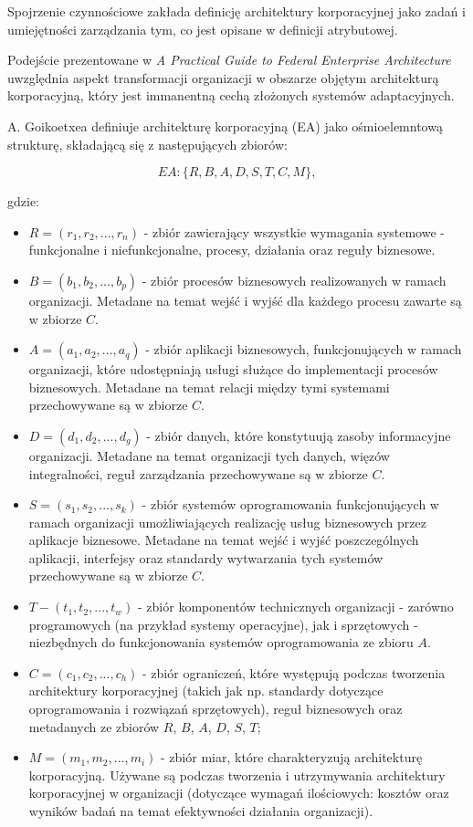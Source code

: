 Spojrzenie czynnościowe zakłada definicję architektury korporacyjnej jako zadań i umiejętności zarządzania tym, co jest opisane w definicji atrybutowej. \cite{ArchKorpSzymSup}

Podejście prezentowane w \emph{A Practical Guide to Federal Enterprise Architecture} uwzględnia aspekt transformacji organizacji w obszarze objętym architekturą korporacyjną, który jest immanentną cechą złożonych systemów adaptacyjnych. \cite{ArchKorpSob} 

A. Goikoetxea definiuje architekturę korporacyjną (EA) jako ośmioelemntową strukturę, składającą się z następujących zbiorów:

\begin{center}
\begin{equation}EA: \{R, B, A, D, S, T, C, M\},\end{equation}
\end{center}

gdzie:
\begin{itemize}
\item{$R = (r_{1}, r_{2},..., r_{n})$ - zbiór zawierający wszystkie wymagania systemowe - funkcjonalne i niefunkcjonalne, procesy, działania oraz reguły biznesowe.}
\item{$B = (b_{1}, b_{2},..., b_{p})$ - zbiór procesów biznesowych realizowanych w ramach organizacji. Metadane na temat wejść i wyjść dla każdego procesu zawarte są w zbiorze $C$.}
\item{$A = (a_{1}, a_{2},..., a_{q})$ - zbiór aplikacji biznesowych, funkcjonujących w ramach organizacji, które udostępniają usługi służące do implementacji procesów biznesowych. Metadane na temat relacji między tymi systemami przechowywane są w zbiorze $C$.}
\item{$D = (d_{1}, d_{2},..., d_{g})$ - zbiór danych, które konstytuują zasoby informacyjne organizacji. Metadane na temat organizacji tych danych, więzów integralności, reguł zarządzania przechowywane są w zbiorze $C$.}
\item{$S = (s_{1}, s_{2},..., s_{k})$ - zbiór systemów oprogramowania funkcjonujących w ramach organizacji umożliwiających realizację usług biznesowych przez aplikacje biznesowe. Metadane na temat wejść i wyjść poszczególnych aplikacji, interfejsy oraz standardy wytwarzania tych systemów przechowywane są w zbiorze $C$.}
\item{$T - (t_{1}, t_{2},..., t_{w})$ - zbiór komponentów technicznych organizacji - zarówno programowych (na przykład systemy operacyjne), jak i sprzętowych - niezbędnych do funkcjonowania systemów oprogramowania ze zbioru $A$.}
\item{$C = (c_{1}, c_{2},..., c_{h})$ - zbiór ograniczeń, które występują podczas tworzenia architektury korporacyjnej (takich jak np. standardy dotyczące oprogramowania i rozwiązań sprzętowych), reguł biznesowych oraz metadanych ze zbiorów $R$, $B$, $A$, $D$, $S$, $T$;}
\item{$M = (m_{1}, m_{2},..., m_{i})$ - zbiór miar, które charakteryzują architekturę korporacyjną. Używane są podczas tworzenia i utrzymywania architektury korporacyjnej w organizacji (dotyczące wymagań ilościowych: kosztów oraz wyników badań na temat efektywności działania organizacji).}
\end{itemize}

